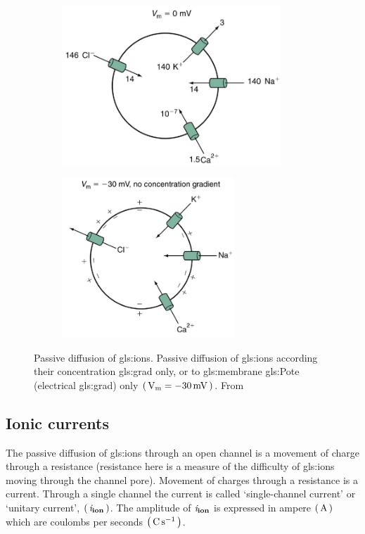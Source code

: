 \documentclass[class={myRUCProject}, crop=false]{standalone}
\begin{document}
\begin{figure}[H]
    \nextfloat
  \begin{subfigure}[t]{0.45\textwidth}
    \centering
    \caption{}\label{sfig:dirA}
    \includegraphics[height=6cm]{Pictures/Anakin/c.grad.png}
  \end{subfigure}
  \hfill
  \begin{subfigure}[t]{0.45\textwidth}
    \centering
    \caption{}\label{sfig:dirB}
    \includegraphics[height=6cm]{Pictures/Anakin/el.grad.png}
  \end{subfigure}
    \caption{Passive diffusion of \glspl{gls:ion}. Passive diffusion of \glspl{gls:ion} according  their concentration \gls{gls:grad} only, or  to \gls{gls:membrane} \gls{gls:Pote} (electrical \gls{gls:grad}) only \(\br{\unit{\V\membrane} = \qty{-30}{\mV}}\). From \cite{Hammond2015ch3}}\label{fig:direction} 
\end{figure}


\subsection{Ionic currents}
The passive diffusion of \glspl{gls:ion} through an open channel is a movement of charge through a resistance (resistance here is a measure of the difficulty of \glspl{gls:ion} moving through the channel pore). Movement of charges through a resistance is a current. Through a single channel the current is called `single-channel current' or `unitary current', \(\left(\,\mathit{i}_\mathbf{ion}\,\right)\). The amplitude of \(\mathit{i}_\mathbf{ion}\) is expressed in ampere \(\br{\unit{\ampere}}\) which are coulombs per seconds \(\br{\unit{\coulomb\per\second}}\). 
\end{document}
